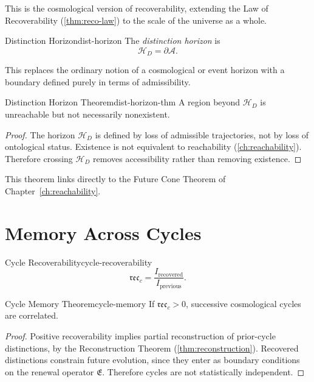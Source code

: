 \documentclass[12pt,twoside,openright]{book}
\newcommand{\reco}{\mathfrak{rec}}
\begin{document}
This is the cosmological version of recoverability,
extending the Law of Recoverability (\cref{thm:reco-law})
to the scale of the universe as a whole.

\begin{definition}{Distinction Horizon}{dist-horizon}
  The \emph{distinction horizon} is
  \[
    \mathcal{H}_D = \partial \mathcal{A}.
  \]
\end{definition}

This replaces the ordinary notion of a cosmological or
event horizon with a boundary defined purely in terms of
admissibility.

\begin{theorem}{Distinction Horizon Theorem}{dist-horizon-thm}
  A region beyond $\mathcal{H}_D$ is unreachable but not
  necessarily nonexistent.
\end{theorem}

\begin{proof}
  The horizon $\mathcal{H}_D$ is defined by loss of
  admissible trajectories, not by loss of ontological
  status. Existence is not equivalent to reachability
  (\cref{ch:reachability}). Therefore crossing $\mathcal{H}_D$
  removes accessibility rather than removing existence.
\end{proof}

This theorem links directly to the Future Cone Theorem of
Chapter~\ref{ch:reachability}.

\section{Memory Across Cycles}
\label{sec:ch19-memory}

\begin{definition}{Cycle Recoverability}{cycle-recoverability}
  \[
    \reco_c = \frac{I_{\mathrm{recovered}}}{I_{\mathrm{previous}}}.
  \]
\end{definition}

\begin{theorem}{Cycle Memory Theorem}{cycle-memory}
  If $\reco_c > 0$, successive cosmological cycles are
  correlated.
\end{theorem}

\begin{proof}
  Positive recoverability implies partial reconstruction
  of prior-cycle distinctions, by the Reconstruction
  Theorem (\cref{thm:reconstruction}). Recovered
  distinctions constrain future evolution, since they
  enter as boundary conditions on the renewal operator
  $\mathfrak{E}$. Therefore cycles are not statistically
  independent.
\end{proof}
\end{document}
